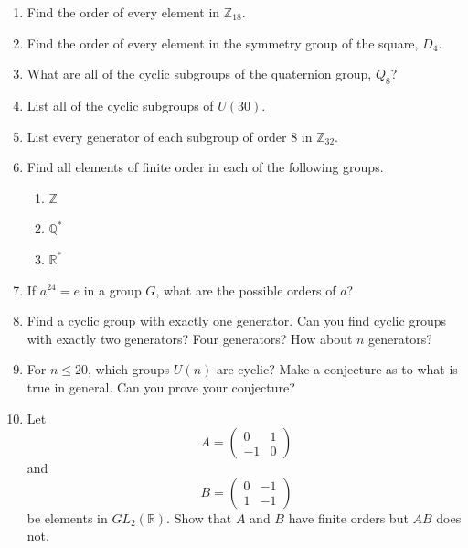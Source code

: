 {\begin{enumerate}
\begin{minipage}[t]{4.6in}
\begin{minipage}[t]{2.25in}
\begin{itemize}
\end{itemize}
\end{minipage}
\end{minipage}
 
\vspace{2pt}        %
 
 
\bf\item\rm		  %
Find the order of every element in ${\mathbb Z}_{18}$.
 
 
\bf\item\rm
Find the order of every element in the symmetry group of the square,
$D_4$.
 
 
\bf\item\rm
What are all of the cyclic subgroups of the quaternion group, $Q_8$? 
 
 
\bf\item\rm
List all of the cyclic subgroups of $U(30)$.
 
 
\bf\item\rm
List every generator of each subgroup of order 8 in ${\mathbb
Z}_{32}$.
 
 
\bf\item\rm
Find all elements of finite order in each of the following groups. 
\begin{enumerate}
 
 \bf\item\rm
${\mathbb Z}$
 
 \bf\item\rm
${\mathbb Q}^\ast$
 
 \bf\item\rm
${\mathbb R}^\ast$
 
\end{enumerate}
 
 
\bf\item\rm
If $a^{24} =e$ in a group $G$, what are the possible orders of $a$? 
 
 
\bf\item\rm
Find a cyclic group with exactly one generator.  Can you find cyclic
groups with exactly two generators?  Four generators?  How about $n$
generators?
 
 
\bf\item\rm
For $n \leq 20$, which groups $U(n)$ are cyclic?  Make a conjecture as
to what is true in general.  Can you prove your conjecture?  
 
 
\bf\item\rm
Let
$$
A=
\left(
\begin{array}{cc}
0 & 1 \\
-1 & 0
\end{array}
\right)
$$
and
$$
B=
\left(
\begin{array}{cc}
0 & -1 \\
1 & -1
\end{array}
\right)
$$
be elements in $GL_2( {\mathbb R} )$. Show that $A$ and $B$ have finite
orders but $AB$ does not. 
 

\end{enumerate}}
